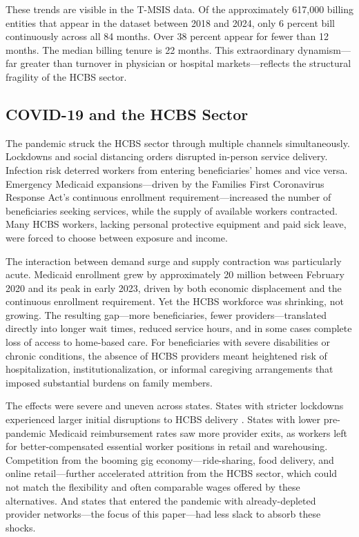 \documentclass[12pt]{article}
\begin{document}
These trends are visible in the T-MSIS data. Of the approximately 617,000 billing entities that appear in the dataset between 2018 and 2024, only 6 percent bill continuously across all 84 months. Over 38 percent appear for fewer than 12 months. The median billing tenure is 22 months. This extraordinary dynamism---far greater than turnover in physician or hospital markets---reflects the structural fragility of the HCBS sector.

\subsection{COVID-19 and the HCBS Sector}

The pandemic struck the HCBS sector through multiple channels simultaneously. Lockdowns and social distancing orders disrupted in-person service delivery. Infection risk deterred workers from entering beneficiaries' homes and vice versa. Emergency Medicaid expansions---driven by the Families First Coronavirus Response Act's continuous enrollment requirement---increased the number of beneficiaries seeking services, while the supply of available workers contracted. Many HCBS workers, lacking personal protective equipment and paid sick leave, were forced to choose between exposure and income.

The interaction between demand surge and supply contraction was particularly acute. Medicaid enrollment grew by approximately 20 million between February 2020 and its peak in early 2023, driven by both economic displacement and the continuous enrollment requirement. Yet the HCBS workforce was shrinking, not growing. The resulting gap---more beneficiaries, fewer providers---translated directly into longer wait times, reduced service hours, and in some cases complete loss of access to home-based care. For beneficiaries with severe disabilities or chronic conditions, the absence of HCBS providers meant heightened risk of hospitalization, institutionalization, or informal caregiving arrangements that imposed substantial burdens on family members.

The effects were severe and uneven across states. States with stricter lockdowns experienced larger initial disruptions to HCBS delivery \citep{kff2022hcbs}. States with lower pre-pandemic Medicaid reimbursement rates saw more provider exits, as workers left for better-compensated essential worker positions in retail and warehousing. Competition from the booming gig economy---ride-sharing, food delivery, and online retail---further accelerated attrition from the HCBS sector, which could not match the flexibility and often comparable wages offered by these alternatives. And states that entered the pandemic with already-depleted provider networks---the focus of this paper---had less slack to absorb these shocks.
\end{document}
